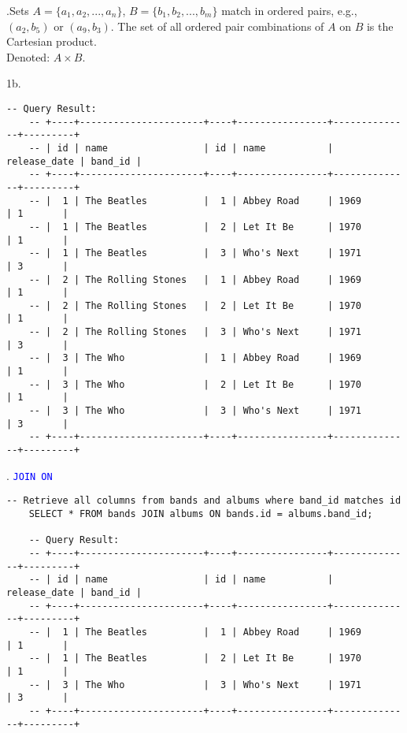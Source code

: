 \begin{Def}
    .Sets $A=\{a_1,a_2,...,a_n\}$, $B=\{b_1,b_2,...,b_m\}$ match in ordered pairs, e.g.,\\
    $(a_2,b_5)$ or $(a_9, b_3)$. The set of all ordered pair combinations of $A$ on $B$ is the Cartesian product.\\

    \noindent
    Denoted: $A\times B$.
\end{Def}
1b.
\begin{lstlisting}[style=sql]
    -- Query Result:
    -- +----+----------------------+----+----------------+--------------+---------+
    -- | id | name                 | id | name           | release_date | band_id |
    -- +----+----------------------+----+----------------+--------------+---------+
    -- |  1 | The Beatles          |  1 | Abbey Road     | 1969         | 1       |
    -- |  1 | The Beatles          |  2 | Let It Be      | 1970         | 1       |
    -- |  1 | The Beatles          |  3 | Who's Next     | 1971         | 3       |
    -- |  2 | The Rolling Stones   |  1 | Abbey Road     | 1969         | 1       |
    -- |  2 | The Rolling Stones   |  2 | Let It Be      | 1970         | 1       |
    -- |  2 | The Rolling Stones   |  3 | Who's Next     | 1971         | 3       |
    -- |  3 | The Who              |  1 | Abbey Road     | 1969         | 1       |
    -- |  3 | The Who              |  2 | Let It Be      | 1970         | 1       |
    -- |  3 | The Who              |  3 | Who's Next     | 1971         | 3       |
    -- +----+----------------------+----+----------------+--------------+---------+
\end{lstlisting}
\newpage

. \textcolor{blue}{\texttt{JOIN ON}}

\begin{lstlisting}[style=sql]
    -- Retrieve all columns from bands and albums where band_id matches id
    SELECT * FROM bands JOIN albums ON bands.id = albums.band_id;

    -- Query Result:
    -- +----+----------------------+----+----------------+--------------+---------+
    -- | id | name                 | id | name           | release_date | band_id |
    -- +----+----------------------+----+----------------+--------------+---------+
    -- |  1 | The Beatles          |  1 | Abbey Road     | 1969         | 1       |
    -- |  1 | The Beatles          |  2 | Let It Be      | 1970         | 1       |
    -- |  3 | The Who              |  3 | Who's Next     | 1971         | 3       |
    -- +----+----------------------+----+----------------+--------------+---------+
\end{lstlisting}

